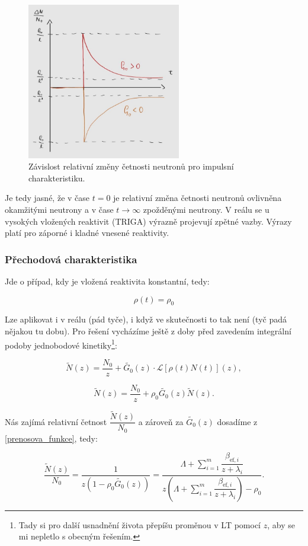 \begin{figure}[H]
  \centering
  \includegraphics[width=0.6\textwidth]{img/impulsni.jpg}
  \caption{Závislost relativní změny četnosti neutronů pro impulsní charakteristiku.}
  \label{fig_impulsni}
\end{figure}

Je tedy jasné, že v čase $t=0$ je relativní změna četnosti neutronů ovlivněna okamžitými neutrony a v čase $t \rightarrow \infty$ zpožděnými neutrony. V reálu se u vysokých vložených reaktivit (TRIGA) výrazně projevují zpětné vazby. Výrazy platí pro záporné i kladné vnesené reaktivity.

\subsubsection{Přechodová charakteristika}

Jde o případ, kdy je vložená reaktivita konstantní, tedy:

$$\rho(t) = \rho_0$$

Lze aplikovat i v reálu (pád tyče), i když ve skutečnosti to tak není (tyč padá nějakou tu dobu). Pro řešení vycházíme ještě z doby před zavedením integrální podoby jednobodové kinetiky\footnote{Tady si pro další usnadnění života přepíšu proměnou v LT pomocí $z$, aby se mi nepletlo s obecným řešením.}:

$$ \tilde{N}(z) = \dfrac{N_0}{z} + \tilde{G_0}(z) \cdot \mathcal{L}[\rho(t) N(t)](z), $$

$$ \tilde{N}(z) = \dfrac{N_0}{z} + \rho_0 \tilde{G_0}(z) \tilde{N}(z).$$

Nás zajímá relativní četnost $\dfrac{\tilde{N}(z)}{N_0}$ a zároveň za $\tilde{G_0}(z)$ dosadíme z \eqref{prenosova_funkce}, tedy:

\begin{equation}
  \boxed{
  \dfrac{\tilde{N}(z)}{N_0} = \dfrac{1}{z \left ( 1-\rho_0 \tilde{G_0}(z) \right )} = \dfrac{\Lambda + \sum_{i = 1}^m \dfrac{\beta_{\text{ef},i}}{z + \lambda_i}}{z \left ( \Lambda + \sum_{i = 1}^m \dfrac{\beta_{\text{ef},i}}{z + \lambda_i} \right ) - \rho_0}.
  \label{prechodova_charakteristika_LT}}
\end{equation}


